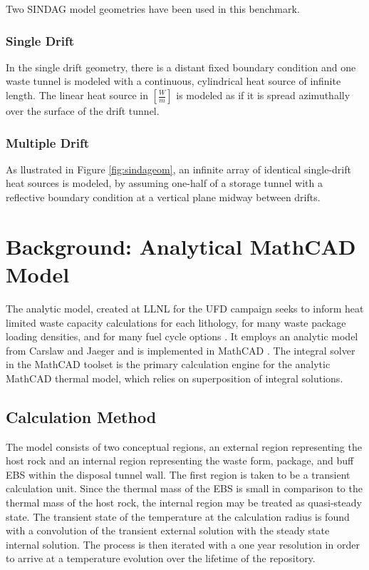 \documentclass{article}
\begin{document}
Two \gls{SINDAG} model geometries have been used in this benchmark.  

\subsubsection{Single Drift}

In the single drift geometry, there is a distant fixed boundary condition and 
one waste tunnel is modeled with a continuous, cylindrical heat source of 
infinite length. The linear heat source in $[\frac{W}{m}]$ is modeled as if it 
is spread azimuthally over the surface of the drift tunnel. 

\subsubsection{Multiple Drift}

As llustrated in Figure \ref{fig:sindageom}, an infinite array of identical single-drift heat sources is modeled,
by assuming one-half of a storage tunnel with a reflective boundary condition at a vertical
plane midway between drifts. 

\section{Background: Analytical MathCAD Model}

The analytic model, created at \gls{LLNL} for the \gls{UFD} campaign seeks to 
inform heat limited waste capacity calculations for each lithology, for many 
waste package loading densities, and for many fuel cycle options 
\cite{hardin_generic_2011, sutton_investigations_2011, 
greenberg_application_2012}. It employs an analytic model from Carslaw and 
Jaeger and is implemented in MathCAD \cite{carslaw_conduction_1959, 
ptc_mathcad_2010}.  The integral solver in the MathCAD toolset is the primary 
calculation engine for the analytic MathCAD thermal model, which relies on 
superposition of integral solutions.  

\subsection{Calculation Method}

The model consists of two conceptual regions, an external region representing 
the host rock and an internal region representing the waste form, package, and 
buff \gls{EBS} within the disposal tunnel wall. The first region is taken to be  
a transient calculation unit.  Since the thermal mass of the \gls{EBS} is small 
in comparison to the thermal mass of the host rock, the internal region may be 
treated as quasi-steady state. The transient state of the temperature at the 
calculation radius is found with a convolution of the transient external 
solution with the steady state internal solution.  The process is then iterated 
with a one year resolution in order to arrive at a temperature evolution over 
the lifetime of the repository. 
\end{document}
